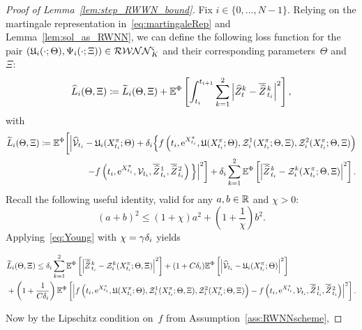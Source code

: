 \begin{proof}[Proof of Lemma~\ref{lem:step_RWWN_bound}]
Fix $i\in\{0,\dots,N-1\}$. Relying on the martingale representation in~\eqref{eq:martingaleRep} and Lemma~\ref{lem:sol_as_RWNN}, we can define the following loss function for the pair $(\mathfrak{U}_i(\cdot; \Theta),\Psi_i(\cdot;\Xi))\in\mathcal{RWNN}^{\varsigma}_K$ and their corresponding parameters~$\Theta$ and~$\Xi$:
    \begin{equation}\label{eq:LHat_LTilde}
        \widehat{L}_i(\Theta,\Xi) \coloneqq  \widetilde{L}_i(\Theta,\Xi) + \mathbb{E}^\Phi\left[\int_{t_i}^{t_{i+1}}\sum_{k=1}^2\left|\widehat Z_t^k - \overline{\widehat{Z}}\kern0.1em^{k}_{t_{i}}\right|^2\right],
    \end{equation}
    with
    \begin{align*}
        \widetilde{L}_i(\Theta,\Xi) \coloneqq  \mathbb{E}^\Phi\bigg[\Big\lvert \widehat {\mathcal{V}}_{t_i} - \mathfrak{U}_i(X^\pi_{t_i}; \Theta) + \delta_{i}  \Big\{ f\left(t_i, \mathrm{e}^{X^\pi_{t_i}}, \mathfrak{U}(X^\pi_{t_i}; \Theta), \mathcal{Z}^1_i(X^\pi_{t_i}; \Theta, \Xi), \mathcal{Z}^2_i(X^\pi_{t_i}; \Theta, \Xi)\right) \\ - f\left(t_i, \mathrm{e}^{X^\pi_{t_i}}, \mathcal{V}_{t_i}, \overline{\widehat{Z}}\kern0.1em^{1}_{t_{i}}, \overline{\widehat{Z}}\kern0.1em^{2}_{t_{i}}\right) \Big\} \Big\rvert^2\bigg] + \delta_{i} \sum_{k=1}^2\mathbb{E}^\Phi\left[ \left\lvert \overline{\widehat{Z}}\kern0.1em^{k}_{t_{i}} - \mathcal{Z}_i^k(X^\pi_{t_i}; \Theta, \Xi)\right\rvert^2\right].
    \end{align*}
    Recall the following useful identity, valid for any
    $a, b\in\mathbb{R}$ and $\chi>0$:
    \begin{equation}\label{eq:Young}
    {(a+b)^2 \leq \left(1+\chi\right)a^2 + \left(1+\frac{1}{\chi}\right)b^2}.
    \end{equation}
    Applying~\eqref{eq:Young} with $\chi = \gamma\delta_{i}$ yields
    \begin{small}
    \begin{align*}
        & \widetilde{L}_i(\Theta, \Xi) \leq \delta_{i} \sum_{k=1}^2\mathbb{E}^\Phi\left[ \left\lvert \overline{\widehat{Z}}\kern0.1em^{k}_{t_{i}} - \mathcal{Z}_i^k(X^\pi_{t_i}; \Theta, \Xi)\right\rvert^2\right] + (1 + C\delta_{i} ) \mathbb{E}^\Phi\left[\left\lvert \widehat {\mathcal{V}}_{t_i} - \mathfrak{U}_i(X^\pi_{t_i}; \Theta)\right\rvert^2\right] \\ 
        & + \left(1+\frac1{C\delta_{i} }\right)\mathbb{E}^\Phi\left[\left\lvert  f\left(t_i, \mathrm{e}^{X^\pi_{t_i}}, \mathfrak{U}(X^\pi_{t_i}; \Theta), \mathcal{Z}^1_i(X^\pi_{t_i}; \Theta, \Xi), \mathcal{Z}^2_i(X^\pi_{t_i}; \Theta, \Xi)\right) - f\left(t_i, \mathrm{e}^{X^\pi_{t_i}}, \mathcal{V}_{t_i}, \overline{\widehat{Z}}\kern0.1em^{1}_{t_{i}}, \overline{\widehat{Z}}\kern0.1em^{2}_{t_{i}}\right) \right\rvert^2\right].
    \end{align*}
    \end{small}%
    Now by the Lipschitz condition on~$f$ from Assumption~\ref{ass:RWNNscheme},

\end{proof}
